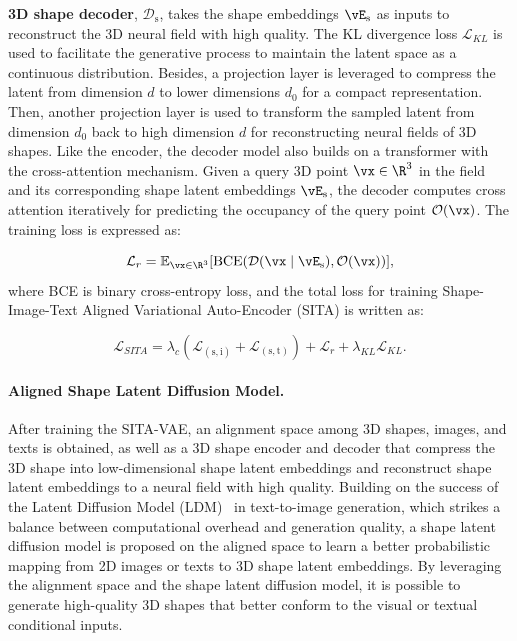 \documentclass[../../book-main.tex]{subfiles}
\begin{document}
\textbf{3D shape decoder}, $\mathcal{D}_{\mathrm{s}}$, takes the
shape embeddings $\vE_{\mathrm{s}}$ as inputs to reconstruct the 3D
neural field with high quality. The KL divergence loss
$\mathcal{L}_{KL}$ is used to facilitate the generative process to
maintain the latent space as a continuous distribution.
Besides, a projection layer is leveraged to compress the latent from
dimension $d$ to lower dimensions $d_0$ for a compact representation.
Then, another projection layer is used to transform the sampled
latent from dimension $d_0$ back to high dimension $d$ for
reconstructing neural fields of 3D shapes.
Like the encoder, the decoder model also builds on a transformer with the
cross-attention mechanism. Given a query 3D point $\vx \in \R^{3}$ in the field
and its corresponding shape latent embeddings $\vE_{\mathrm{s}}$, the decoder
computes cross attention iteratively for predicting the occupancy of the query
point $\mathcal{O} (\vx)$. The training loss is expressed as:

\begin{equation}
\mathcal{L}_r = \mathbb{E}_{\vx \in \R^3} [\text{BCE}(
\mathcal{D}(\vx \mid \vE_{\mathrm{s}} ), \mathcal{O}(\vx) )],
\end{equation}
where BCE is binary cross-entropy loss, and the total loss for
training Shape-Image-Text Aligned Variational Auto-Encoder (SITA) is written as:

\begin{equation}
\mathcal{L}_{SITA} = \lambda_c (\mathcal{L}_{(\mathrm{s},\mathrm{i})}
+ \mathcal{L}_{(\mathrm{s},\mathrm{t})}) + \mathcal{L}_r +
\lambda_{KL} \mathcal{L}_{KL}.
\label{eq:sita_vae}
\end{equation}

\paragraph{Aligned Shape Latent Diffusion Model.}
After training the SITA-VAE, an alignment space among 3D shapes,
images, and texts is obtained, as well as a 3D shape encoder and
decoder that compress the 3D shape into low-dimensional shape latent
embeddings and reconstruct shape latent embeddings to a neural field
with high quality. Building on the success of the Latent Diffusion
Model (LDM)~\cite{rombach2022high} in text-to-image generation, which
strikes a balance between computational overhead and generation
quality, a shape latent diffusion model is proposed on the aligned
space to learn a better probabilistic mapping from 2D images or texts
to 3D shape latent embeddings. By leveraging the alignment space and
the shape latent diffusion model, it is possible to generate
high-quality 3D shapes that better conform to the visual or textual
conditional inputs.
\end{document}
